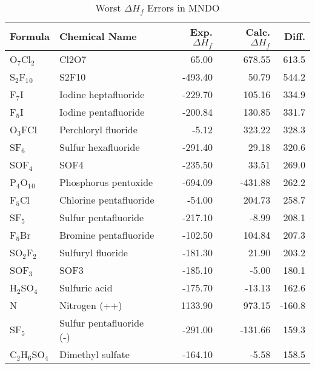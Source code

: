 \begin{table}
\caption{\label{wemndo} Worst $\Delta H_f$ Errors in MNDO}
\compresstable
\begin{center}
\begin{tabular}{llrrr}
 Formula & Chemical Name & Exp. $\Delta H_f$ & Calc. $\Delta H_f$ & Diff.\\
 \hline
 O$_7$Cl$_2$          & Cl2O7                                  &   65.00   &   678.55   &  613.5\\
 S$_2$F$_1$$_0$       & S2F10                                  & -493.40   &    50.79   &  544.2\\
 F$_7$I               & Iodine heptafluoride                   & -229.70   &   105.16   &  334.9\\
 F$_5$I               & Iodine pentafluoride                   & -200.84   &   130.85   &  331.7\\
 O$_3$FCl             & Perchloryl fluoride                    &   -5.12   &   323.22   &  328.3\\
 SF$_6$               & Sulfur hexafluoride                    & -291.40   &    29.18   &  320.6\\
 SOF$_4$              & SOF4                                   & -235.50   &    33.51   &  269.0\\
 P$_4$O$_1$$_0$       & Phosphorus pentoxide                   & -694.09   &  -431.88   &  262.2\\
 F$_5$Cl              & Chlorine pentafluoride                 &  -54.00   &   204.73   &  258.7\\
 SF$_5$               & Sulfur pentafluoride                   & -217.10   &    -8.99   &  208.1\\
 F$_5$Br              & Bromine pentafluoride                  & -102.50   &   104.84   &  207.3\\
 SO$_2$F$_2$          & Sulfuryl fluoride                      & -181.30   &    21.90   &  203.2\\
 SOF$_3$              & SOF3                                   & -185.10   &    -5.00   &  180.1\\
 H$_2$SO$_4$          & Sulfuric acid                          & -175.70   &   -13.13   &  162.6\\
 N                    & Nitrogen (++)                          & 1133.90   &   973.15   & -160.8\\
 SF$_5$               & Sulfur pentafluoride (-)               & -291.00   &  -131.66   &  159.3\\
 C$_2$H$_6$SO$_4$     & Dimethyl sulfate                       & -164.10   &    -5.58   &  158.5\\

\end{tabular}
\end{center}
\end{table}
